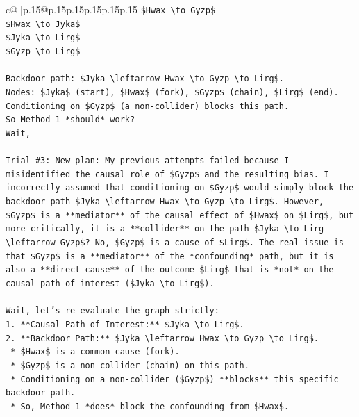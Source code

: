 \documentclass{article}
\begin{document}
{\begin{supertabular}{c@{$\;$}|p{.15\linewidth}@{}p{.15\linewidth}p{.15\linewidth}p{.15\linewidth}p{.15\linewidth}p{.15\linewidth}}
{{{\texttt{\$Hwax \textbackslash{}to Gyzp\$} \\
\texttt{\$Hwax \textbackslash{}to Jyka\$} \\
\texttt{\$Jyka \textbackslash{}to Lirg\$} \\
\texttt{\$Gyzp \textbackslash{}to Lirg\$} \\
\\ 
\texttt{Backdoor path: \$Jyka \textbackslash{}leftarrow Hwax \textbackslash{}to Gyzp \textbackslash{}to Lirg\$.} \\
\texttt{Nodes: \$Jyka\$ (start), \$Hwax\$ (fork), \$Gyzp\$ (chain), \$Lirg\$ (end).} \\
\texttt{Conditioning on \$Gyzp\$ (a non{-}collider) blocks this path.} \\
\texttt{So Method 1 *should* work?} \\
\texttt{Wait,} \\
\\ 
\texttt{Trial \#3: New plan: My previous attempts failed because I misidentified the causal role of \$Gyzp\$ and the resulting bias. I incorrectly assumed that conditioning on \$Gyzp\$ would simply block the backdoor path \$Jyka \textbackslash{}leftarrow Hwax \textbackslash{}to Gyzp \textbackslash{}to Lirg\$. However, \$Gyzp\$ is a **mediator** of the causal effect of \$Hwax\$ on \$Lirg\$, but more critically, it is a **collider** on the path \$Jyka \textbackslash{}to Lirg \textbackslash{}leftarrow Gyzp\$? No, \$Gyzp\$ is a cause of \$Lirg\$. The real issue is that \$Gyzp\$ is a **mediator** of the *confounding* path, but it is also a **direct cause** of the outcome \$Lirg\$ that is *not* on the causal path of interest (\$Jyka \textbackslash{}to Lirg\$).} \\
\\ 
\texttt{Wait, let's re{-}evaluate the graph strictly:} \\
\texttt{1.  **Causal Path of Interest:** \$Jyka \textbackslash{}to Lirg\$.} \\
\texttt{2.  **Backdoor Path:** \$Jyka \textbackslash{}leftarrow Hwax \textbackslash{}to Gyzp \textbackslash{}to Lirg\$.} \\
\texttt{    *   \$Hwax\$ is a common cause (fork).} \\
\texttt{    *   \$Gyzp\$ is a non{-}collider (chain) on this path.} \\
\texttt{    *   Conditioning on a non{-}collider (\$Gyzp\$) **blocks** this specific backdoor path.} \\
\texttt{    *   So, Method 1 *does* block the confounding from \$Hwax\$.} \\
}}}
\end{supertabular}}
\end{document}
